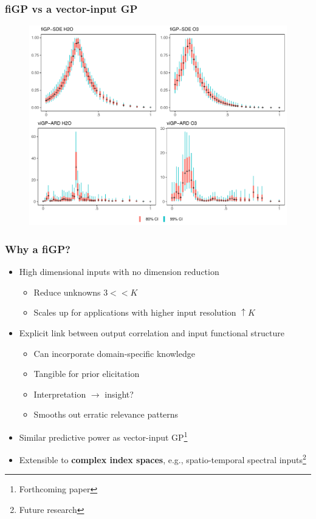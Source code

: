 \documentclass[aspectratio=169,t,xcolor=table]{beamer}
\begin{document}
\begin{frame}
  \frametitle{fiGP vs a vector-input GP}

  \begin{figure}
    \centering
    \includegraphics[height=.8\textheight]{weights-examples-pressure.pdf}
  \end{figure}
\end{frame}

\begin{frame}
  \frametitle{Why a fiGP?}
  \begin{itemize}
  \item[+]<1-> High dimensional inputs with no dimension reduction
    \begin{itemize}
    \item Reduce unknowns $3 << K$
    \item Scales up for applications with higher input resolution
      $\uparrow K$
    \end{itemize}
  \item[+]<2-> Explicit link between output correlation and
    input functional structure
    \begin{itemize}
    \item<2-> Can incorporate domain-specific knowledge
    \item<2-> Tangible for prior elicitation
    \item<2-> Interpretation $\to$ insight?
    \item<2-> Smooths out erratic relevance patterns
    \end{itemize}
  \item[+]<3-> Similar predictive power as vector-input
    GP\footnote{Forthcoming paper}
  \item[++]<4-> Extensible to \alert{\textbf{complex
index spaces}}, e.g., spatio-temporal spectral inputs\footnote{Future research}
  \end{itemize}
\end{frame}
\end{document}
